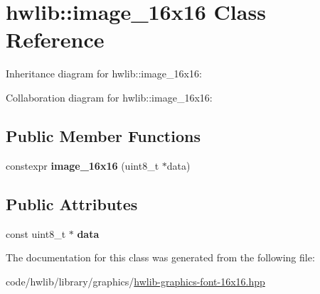 \hypertarget{classhwlib_1_1image__16x16}{}\section{hwlib\+:\+:image\+\_\+16x16 Class Reference}
\label{classhwlib_1_1image__16x16}


Inheritance diagram for hwlib\+:\+:image\+\_\+16x16\+:


Collaboration diagram for hwlib\+:\+:image\+\_\+16x16\+:
\subsection*{Public Member Functions}
\begin{DoxyCompactItemize}
\item 
\mbox{\label{classhwlib_1_1image__16x16_a55d9a91ab23947cfe7068042400b365a}} 
constexpr {\bfseries image\+\_\+16x16} (uint8\+\_\+t $\ast$data)
\end{DoxyCompactItemize}
\subsection*{Public Attributes}
\begin{DoxyCompactItemize}
\item 
\mbox{\label{classhwlib_1_1image__16x16_aaa09970db4822448e13a41b355a8ae9f}} 
const uint8\+\_\+t $\ast$ {\bfseries data}
\end{DoxyCompactItemize}


The documentation for this class was generated from the following file\+:\begin{DoxyCompactItemize}
\item 
code/hwlib/library/graphics/\hyperlink{hwlib-graphics-font-16x16_8hpp}{hwlib-\/graphics-\/font-\/16x16.\+hpp}\end{DoxyCompactItemize}
